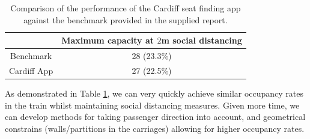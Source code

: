 \documentclass[11pt,a4paper]{article}
\begin{document}








\begin{table}[ht!]
\begin{center}
 \begin{tabular}{|c |c|}
 \hline
& \textbf{Maximum capacity at $2$m social distancing }\\
 \hline

 Benchmark &   28 (23.3\%)\footnotemark \\
 \hline
 Cardiff App  & 27 (22.5\%)\\

\hline
\end{tabular}
\end{center}
\caption{Comparison of the performance of the Cardiff seat finding app against the benchmark provided in the supplied report.}
\label{tab:performance}
\end{table}



As demonstrated in Table \ref{tab:performance}, we can very quickly achieve similar occupancy rates in the train whilst maintaining social distancing measures. Given more time, we can develop methods for taking passenger direction into account, and geometrical constrains (walls/partitions in the carriages) allowing for higher occupancy rates.
\end{document}

